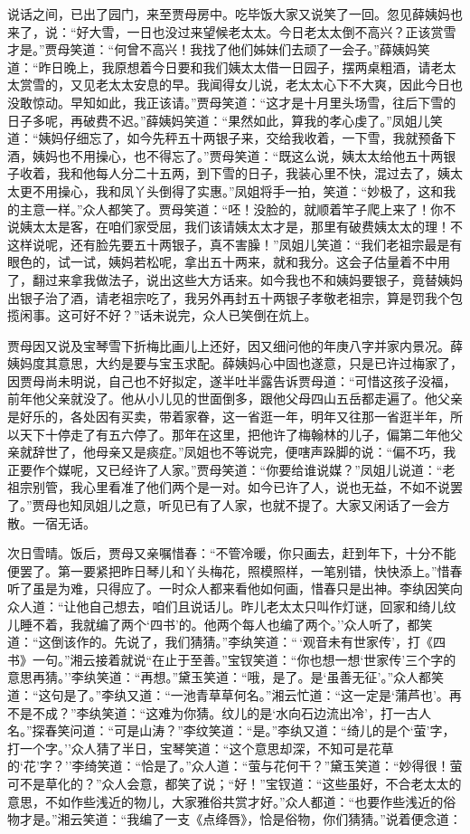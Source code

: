 说话之间，已出了园门，来至贾母房中。吃毕饭大家又说笑了一回。忽见薛姨妈也来了，说：``好大雪，一日也没过来望候老太太。今日老太太倒不高兴？正该赏雪才是。''贾母笑道：``何曾不高兴！我找了他们姊妹们去顽了一会子。''薛姨妈笑道：``昨日晚上，我原想着今日要和我们姨太太借一日园子，摆两桌粗酒，请老太太赏雪的，又见老太太安息的早。我闻得女儿说，老太太心下不大爽，因此今日也没敢惊动。早知如此，我正该请。''贾母笑道：``这才是十月里头场雪，往后下雪的日子多呢，再破费不迟。''薛姨妈笑道：``果然如此，算我的孝心虔了。''凤姐儿笑道：``姨妈仔细忘了，如今先秤五十两银子来，交给我收着，一下雪，我就预备下酒，姨妈也不用操心，也不得忘了。''贾母笑道：``既这么说，姨太太给他五十两银子收着，我和他每人分二十五两，到下雪的日子，我装心里不快，混过去了，姨太太更不用操心，我和凤丫头倒得了实惠。''凤姐将手一拍，笑道：``妙极了，这和我的主意一样。''众人都笑了。贾母笑道：``呸！没脸的，就顺着竿子爬上来了！你不说姨太太是客，在咱们家受屈，我们该请姨太太才是，那里有破费姨太太的理！不这样说呢，还有脸先要五十两银子，真不害臊！''凤姐儿笑道：``我们老祖宗最是有眼色的，试一试，姨妈若松呢，拿出五十两来，就和我分。这会子估量着不中用了，翻过来拿我做法子，说出这些大方话来。如今我也不和姨妈要银子，竟替姨妈出银子治了酒，请老祖宗吃了，我另外再封五十两银子孝敬老祖宗，算是罚我个包揽闲事。这可好不好？''话未说完，众人已笑倒在炕上。

贾母因又说及宝琴雪下折梅比画儿上还好，因又细问他的年庚八字并家内景况。薛姨妈度其意思，大约是要与宝玉求配。薛姨妈心中固也遂意，只是已许过梅家了，因贾母尚未明说，自己也不好拟定，遂半吐半露告诉贾母道：``可惜这孩子没福，前年他父亲就没了。他从小儿见的世面倒多，跟他父母四山五岳都走遍了。他父亲是好乐的，各处因有买卖，带着家眷，这一省逛一年，明年又往那一省逛半年，所以天下十停走了有五六停了。那年在这里，把他许了梅翰林的儿子，偏第二年他父亲就辞世了，他母亲又是痰症。''凤姐也不等说完，便嗐声跺脚的说：``偏不巧，我正要作个媒呢，又已经许了人家。''贾母笑道：``你要给谁说媒？''凤姐儿说道：``老祖宗别管，我心里看准了他们两个是一对。如今已许了人，说也无益，不如不说罢了。''贾母也知凤姐儿之意，听见已有了人家，也就不提了。大家又闲话了一会方散。一宿无话。

次日雪晴。饭后，贾母又亲嘱惜春：``不管冷暖，你只画去，赶到年下，十分不能便罢了。第一要紧把昨日琴儿和丫头梅花，照模照样，一笔别错，快快添上。''惜春听了虽是为难，只得应了。一时众人都来看他如何画，惜春只是出神。李纨因笑向众人道：``让他自己想去，咱们且说话儿。昨儿老太太只叫作灯谜，回家和绮儿纹儿睡不着，我就编了两个`四书'的。他两个每人也编了两个。''众人听了，都笑道：``这倒该作的。先说了，我们猜猜。''李纨笑道：``\,`观音未有世家传'，打《四书》一句。''湘云接着就说``在止于至善。''宝钗笑道：``你也想一想`世家传'三个字的意思再猜。''李纨笑道：``再想。''黛玉笑道：``哦，是了。是`虽善无征'。''众人都笑道：``这句是了。''李纨又道：``一池青草草何名。''湘云忙道：``这一定是`蒲芦也'。再不是不成？''李纨笑道：``这难为你猜。纹儿的是`水向石边流出冷'，打一古人名。''探春笑问道：``可是山涛？''李纹笑道：``是。''李纨又道：``绮儿的是个`萤'字，打一个字。''众人猜了半日，宝琴笑道：``这个意思却深，不知可是花草的`花'字？''李绮笑道：``恰是了。''众人道：``萤与花何干？''黛玉笑道：``妙得很！萤可不是草化的？''众人会意，都笑了说；``好！''宝钗道：``这些虽好，不合老太太的意思，不如作些浅近的物儿，大家雅俗共赏才好。''众人都道：``也要作些浅近的俗物才是。''湘云笑道：``我编了一支《点绛唇》，恰是俗物，你们猜猜。''说着便念道：

